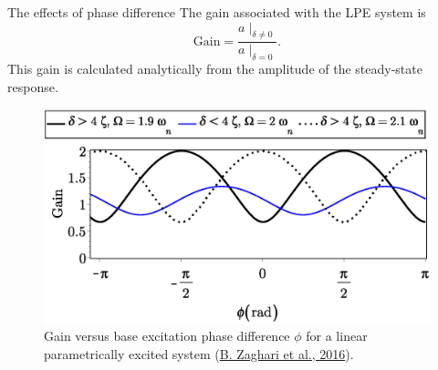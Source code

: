 \documentclass[LaTeX2e,10pt]{beamer}
\begin{document}
\begin{frame}{The effects of phase difference}
The gain associated with the LPE system is
\begin{equation}
\mathrm{Gain} = \frac{a\mid_{\delta \neq 0}}{a \mid_{\delta = 0}}.
\label{eq:gain}
\end{equation}
This gain is calculated analytically from the amplitude of the steady-state response.

\begin{figure}
\includegraphics[width=0.7\linewidth]{Images/LinearPEPhase3Cases.eps}
\caption{Gain versus base excitation phase difference $\phi$ for a linear parametrically excited system (\href{https://eprints.soton.ac.uk/399582/}{B. Zaghari et al., 2016}).} 
\end{figure}
\end{frame}
\end{document}
